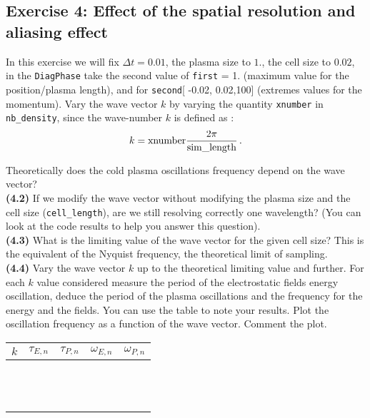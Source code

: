 \documentclass[11pt,a4paper]{article}
\begin{document}
\subsection*{Exercise 4: Effect of the spatial resolution and aliasing effect}

In this exercise we will fix $\Delta t = 0.01$, the plasma size to $1.$, the cell size to $0.02$, 
 in the \texttt{DiagPhase} take the second value of   \texttt{first} = 1. (maximum value for the position/plasma length), and for \texttt{second}[ -0.02, 0.02,100] (extremes values for the momentum). 
Vary the wave vector $k$ by varying the quantity \texttt{xnumber} in \texttt{nb\_density}, since the  
 wave-number $k$ is defined as :
\begin{eqnarray}\label{eq_k1}
k = {\rm xnumber} \frac{2\pi}{\rm sim\_length}\,.
\end{eqnarray}


  Theoretically does the cold plasma oscillations frequency depend on the wave vector? \\
{\bf (4.2)} If we modify the wave vector without modifying the plasma size and the cell size (\texttt{cell\_length}), are we still resolving correctly one wavelength? (You can look at the code results to help you answer this question). \\
{\bf (4.3)} What is the limiting value of the wave vector for the given cell size? This is the equivalent of the Nyquist frequency, the theoretical limit of sampling. \\
{\bf (4.4)} Vary the wave vector $k$ up to the theoretical limiting value  and further. For each $k$ value considered measure the period of the electrostatic fields energy oscillation, deduce the period of the plasma oscillations and the frequency for the energy and the fields. 
You can use the table to note your results. Plot the oscillation frequency as a function of the wave vector. Comment the plot. \\


\begin{tabularx}{0.95\textwidth}{X|X|X|X|X}
\centering\large\textbf{$k$} & \centering\large\textbf{$\tau_{E,n}$} & \centering\large\textbf{$\tau_{P,n}$} &  \centering\large\textbf{$\omega_{E,n}$} & \centering\arraybackslash\large\textbf{$\omega_{P,n}$} \\
\hline
 & & & & \\  & & & & \\ \hline  & & & & \\  & & & & \\ \hline  & & & & \\  & & & & \\ \hline  & & & & \\  & & & & \\ \hline  & & & & \\  & & & & \\ \hline  & & & & \\  & & & & \\ 
\end{tabularx}
\end{document}
